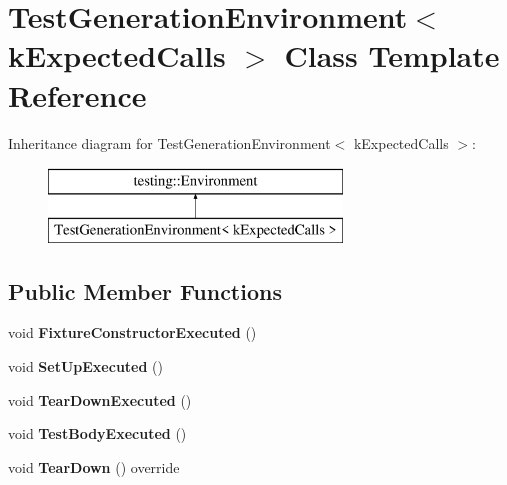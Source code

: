 \hypertarget{classTestGenerationEnvironment}{}\section{Test\+Generation\+Environment$<$ k\+Expected\+Calls $>$ Class Template Reference}
\label{classTestGenerationEnvironment}
Inheritance diagram for Test\+Generation\+Environment$<$ k\+Expected\+Calls $>$\+:\begin{figure}[H]
\begin{center}
\leavevmode
\includegraphics[height=2.000000cm]{classTestGenerationEnvironment}
\end{center}
\end{figure}
\subsection*{Public Member Functions}
\begin{DoxyCompactItemize}
\item 
\mbox{\label{classTestGenerationEnvironment_abcdae77887fbd6dba18f4a55b80f058d}} 
void {\bfseries Fixture\+Constructor\+Executed} ()
\item 
\mbox{\label{classTestGenerationEnvironment_aa17c620af5eb9929bdbde25820cd8e28}} 
void {\bfseries Set\+Up\+Executed} ()
\item 
\mbox{\label{classTestGenerationEnvironment_a0d2576b10818bae1945e17e6e749ff9b}} 
void {\bfseries Tear\+Down\+Executed} ()
\item 
\mbox{\label{classTestGenerationEnvironment_a358a1d7cbefc3f9157f625f87dbde754}} 
void {\bfseries Test\+Body\+Executed} ()
\item 
\mbox{\label{classTestGenerationEnvironment_af7731d3161d89e3bd456cd204e2c4890}} 
void {\bfseries Tear\+Down} () override
\end{DoxyCompactItemize}
